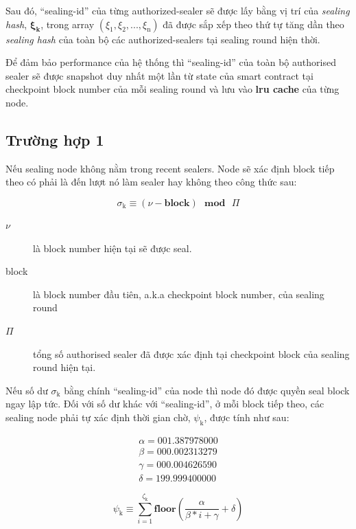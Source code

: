 \documentclass[12pt]{amsart}
\begin{document}
\begin{multicols}{2}
Sau đó, ``sealing-id'' của từng authorized-sealer sẽ được lấy bằng vị trí của \textit{sealing hash}, $\boldsymbol{\xi_k}$, trong array $(\xi_{\mathrm{1}}, \xi_{\mathrm{2}}, ..., \xi_{\mathrm{n}})$ đã được sắp xếp theo thứ tự tăng dần theo \textit{sealing hash} của toàn bộ các authorized-sealers tại sealing round hiện thời.

Để đảm bảo performance của hệ thống thì ``sealing-id'' của toàn bộ authorised sealer sẽ được snapshot duy nhất một lần từ state của smart contract tại checkpoint block number của mỗi sealing round và lưu vào \textbf{lru cache} của từng node.

\subsection{Trường hợp 1} Nếu sealing node không nằm trong recent sealers. Node sẽ xác định block tiếp theo có phải là đến lượt nó làm sealer hay không theo công thức sau:

\begin{equation}\label{eq:sigma}
\sigma_{\mathrm{k}} \equiv (\nu - \mathbf{block}) \ \ \ \mathbf{mod} \ \ \ \Pi
\end{equation}

\begin{description}
\item[$\nu$] là block number hiện tại sẽ được seal.
\item[block] là block number đầu tiên, a.k.a checkpoint block number, của sealing round
\item[$\Pi$] tổng số authorised sealer đã được xác định tại checkpoint block của sealing round hiện tại.
\end{description}

Nếu số dư $\sigma_{\mathrm{k}}$ bằng chính ``sealing-id'' của node thì node đó được quyền seal block ngay lập tức. Đối với số dư khác với ``sealing-id'', ở mỗi block tiếp theo, các sealing node phải tự xác định thời gian chờ, $\psi_{\mathrm{k}}$, được tính như sau:

\begin{eqnarray}
\alpha = 001.387978000 \\
\beta = 000.002313279 \\
\gamma = 000.004626590 \\
\delta = 199.999400000
\end{eqnarray}

\begin{equation}\label{eq:psi}
\psi_{\mathrm{k}} \equiv \sum_{i=1}^{\zeta_\mathrm{k}} \mathbf{floor}(\frac{\alpha}{\beta*i+\gamma} + \delta)
\end{equation}


\end{multicols}
\end{document}
